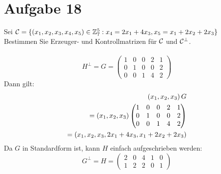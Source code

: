 \section*{Aufgabe 18}
Sei $\mathcal{C} = \lbrace (x_1,x_2,x_3,x_4,x_5) \in \mathbb{Z}^5_7 : x_4 = 2x_1 + 4x_3, x_5 = x_1 + 2x_2 + 2x_3 \rbrace$
Bestimmen Sie Erzeuger- und Kontrollmatrizen für $\mathcal{C}$ und $\mathcal{C}^\bot$.\\\\
\begin{equation*}
  H^\bot = G =
  \begin{pmatrix}
  1 & 0 & 0 & 2 & 1 \\
  0 & 1 & 0 & 0 & 2 \\
  0 & 0 & 1 & 4 & 2 
  \end{pmatrix}
\end{equation*}
Dann gilt: 
\begin{align*}
  \left( x_1, x_2, x_3 \right) G\\
= \left( x_1, x_2, x_3 \right)
  \begin{pmatrix}
  1 & 0 & 0 & 2 & 1 \\
  0 & 1 & 0 & 0 & 2 \\
  0 & 0 & 1 & 4 & 2 
  \end{pmatrix}\\
= \left( x_1, x_2, x_3, 2x_1+4x_3, x_1+2x_2+2x_3 \right)
\end{align*}
Da $G$ in Standardform ist, kann $H$ einfach aufgeschrieben werden:
\begin{equation*}
  G^\bot = H = 
  \begin{pmatrix}
  2 & 0 & 4 & 1 & 0 \\
  1 & 2 & 2 & 0 & 1 
  \end{pmatrix}
\end{equation*}
